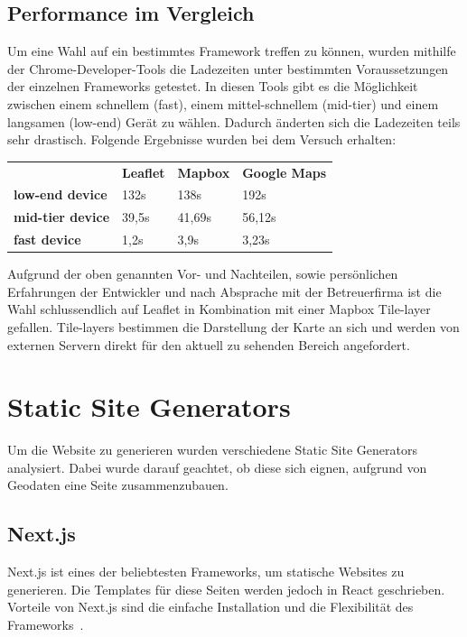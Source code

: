 \subsection{Performance im Vergleich}
Um eine Wahl auf ein bestimmtes Framework treffen zu können, wurden mithilfe der Chrome-Developer-Tools die Ladezeiten
unter bestimmten Voraussetzungen der einzelnen Frameworks getestet.
In diesen Tools gibt es die Möglichkeit zwischen einem schnellem (fast), einem mittel-schnellem (mid-tier) und einem
langsamen (low-end) Gerät zu wählen.
Dadurch änderten sich die Ladezeiten teils sehr drastisch.
Folgende Ergebnisse wurden bei dem Versuch erhalten:

\begin{table}[hbt!]
    \centering
    \begin{tabular}{llll}
        & \textbf{Leaflet} & \textbf{Mapbox} & \textbf{Google Maps} \\
        \textbf{low-end device}  & 132s             & 138s            & 192s                 \\
        \textbf{mid-tier device} & 39,5s            & 41,69s          & 56,12s               \\
        \textbf{fast device}     & 1,2s             & 3,9s            & 3,23s
    \end{tabular}\label{tab:map-framework-table}
\end{table}

Aufgrund der oben genannten Vor- und Nachteilen, sowie persönlichen Erfahrungen der Entwickler und nach Absprache mit der
Betreuerfirma ist die Wahl schlussendlich auf Leaflet in Kombination mit einer Mapbox Tile-layer gefallen.
Tile-layers bestimmen die Darstellung der Karte an sich und werden von externen Servern direkt für den aktuell zu sehenden Bereich angefordert.

\cleardoublepage

\section{Static Site Generators}
Um die Website zu generieren wurden verschiedene Static Site Generators analysiert.
Dabei wurde darauf geachtet, ob diese sich eignen, aufgrund von Geodaten eine Seite zusammenzubauen.

\subsection{Next.js}
Next.js ist eines der beliebtesten Frameworks, um statische Websites zu generieren.
Die Templates für diese Seiten werden jedoch in React geschrieben.
Vorteile von Next.js sind die einfache Installation und die Flexibilität des Frameworks~\cite{nextjs}.

